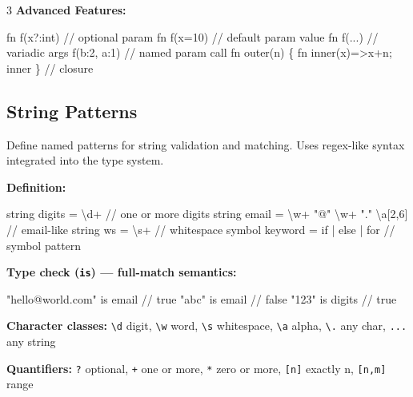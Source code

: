 \documentclass[8pt,landscape,a4paper,oneside]{article}
\newenvironment{Shaded}{%
  \begin{snugshade}%
  \vspace{0.4\baselineskip}%
  \fontsize{9}{10}\selectfont%
  \setlength{\parskip}{0pt}%
  \setlength{\topsep}{0pt}%
  \setlength{\partopsep}{0pt}%
}{%
  \vspace{0.01\baselineskip}%
  \end{snugshade}%
}
\newcommand{\NormalTok}[1]{#1}
\begin{document}
\begin{multicols*}{3}
\textbf{Advanced Features:}

\begin{Shaded}
\begin{Highlighting}[]
\NormalTok{fn f(x?:int)    // optional param}
\NormalTok{fn f(x=10)      // default param value}
\NormalTok{fn f(...)       // variadic args}
\NormalTok{f(b:2, a:1)     // named param call}
\NormalTok{fn outer(n) \{ fn inner(x)=\textgreater{}x+n; inner \} // closure}
\end{Highlighting}
\end{Shaded}

\subsection{String Patterns}\label{string-patterns}

Define named patterns for string validation and matching. Uses
regex-like syntax integrated into the type system.

\textbf{Definition:}

\begin{Shaded}
\begin{Highlighting}[]
\NormalTok{string digits = \textbackslash{}d+                    // one or more digits}
\NormalTok{string email = \textbackslash{}w+ "@" \textbackslash{}w+ "." \textbackslash{}a[2,6] // email{-}like}
\NormalTok{string ws = \textbackslash{}s+                        // whitespace}
\NormalTok{symbol keyword = \textquotesingle{}if\textquotesingle{} | \textquotesingle{}else\textquotesingle{} | \textquotesingle{}for\textquotesingle{} // symbol pattern}
\end{Highlighting}
\end{Shaded}

\textbf{Type check (\texttt{is}) --- full-match semantics:}

\begin{Shaded}
\begin{Highlighting}[]
\NormalTok{"hello@world.com" is email    // true}
\NormalTok{"abc" is email                // false}
\NormalTok{"123" is digits               // true}
\end{Highlighting}
\end{Shaded}

\textbf{Character classes:} \texttt{\textbackslash{}d} digit,
\texttt{\textbackslash{}w} word, \texttt{\textbackslash{}s} whitespace,
\texttt{\textbackslash{}a} alpha, \texttt{\textbackslash{}.} any char,
\texttt{...} any string

\textbf{Quantifiers:} \texttt{?} optional, \texttt{+} one or more,
\texttt{*} zero or more, \texttt{{[}n{]}} exactly n, \texttt{{[}n,m{]}}
range


\end{multicols*}
\end{document}
